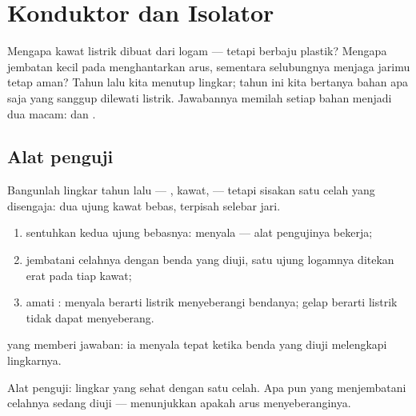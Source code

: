 \chapter{Konduktor dan Isolator}\label{ch:g4:conductors-insulators}

Mengapa kawat listrik dibuat dari logam --- tetapi berbaju plastik?
Mengapa jembatan kecil pada  menghantarkan arus, sementara
selubungnya menjaga jarimu tetap aman? Tahun lalu kita menutup
lingkar; tahun ini kita bertanya bahan apa saja yang sanggup dilewati
listrik. Jawabannya memilah setiap bahan menjadi dua macam: 
dan .

\section{Alat penguji}

\begin{method}\label{met:g4:conductors-insulators:tester}
Bangunlah lingkar tahun lalu --- , kawat,  --- tetapi
sisakan satu celah yang disengaja: dua ujung kawat bebas, terpisah
selebar jari.
\begin{enumerate}
  \item sentuhkan kedua ujung bebasnya:  menyala ---
        alat pengujinya bekerja;
  \item jembatani celahnya dengan benda yang diuji, satu ujung
        logamnya ditekan erat pada tiap kawat;
  \item amati : menyala berarti listrik menyeberangi
        bendanya; gelap berarti listrik tidak dapat menyeberang.
\end{enumerate}
 yang memberi jawaban: ia menyala tepat ketika benda yang
diuji melengkapi lingkarnya.
\end{method}

\begin{omfigure}

{\small Alat penguji: lingkar yang sehat dengan satu celah. Apa pun
yang menjembatani celahnya sedang diuji ---  menunjukkan
apakah arus menyeberanginya.}
\end{omfigure}

